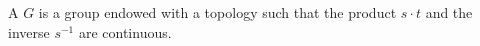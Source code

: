 A  $G$ is a group endowed with a topology such that the product $s \cdot t$ and the inverse $s^{-1}$ are continuous.
